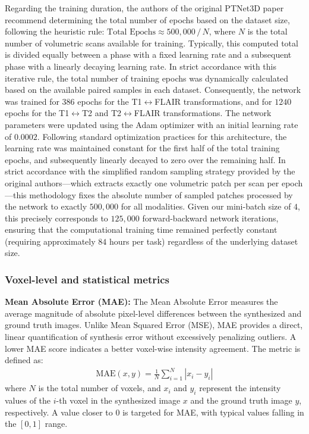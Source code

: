 \documentclass[11pt,a4paper]{article}
\begin{document}
Regarding the training duration, the authors of the original PTNet3D paper recommend determining the total number of epochs based on the dataset size, following the heuristic rule: \(\text{Total Epochs} \approx 500,000 \, / \, N\), where \(N\) is the total number of volumetric scans available for training. Typically, this computed total is divided equally between a phase with a fixed learning rate and a subsequent phase with a linearly decaying learning rate. In strict accordance with this iterative rule, the total number of training epochs was dynamically calculated based on the available paired samples in each dataset. Consequently, the network was trained for $386$ epochs for the T1$\leftrightarrow$FLAIR transformations, and for $1240$ epochs for the T1$\leftrightarrow$T2 and T2$\leftrightarrow$FLAIR transformations. The network parameters were updated using the Adam optimizer with an initial learning rate of $0.0002$. Following standard optimization practices for this architecture, the learning rate was maintained constant for the first half of the total training epochs, and subsequently linearly decayed to zero over the remaining half. In strict accordance with the simplified random sampling strategy provided by the original authors---which extracts exactly one volumetric patch per scan per epoch---this methodology fixes the absolute number of sampled patches processed by the network to exactly $500,000$ for all modalities. Given our mini-batch size of $4$, this precisely corresponds to $125,000$ forward-backward network iterations, ensuring that the computational training time remained perfectly constant (requiring approximately $84$ hours per task) regardless of the underlying dataset size.

\subsubsection*{Voxel-level and statistical metrics}
\noindent
\textbf{Mean Absolute Error (MAE):} The Mean Absolute Error \cite{willmott2005advantages} measures the average magnitude of absolute pixel-level differences between the synthesized and ground truth images. Unlike Mean Squared Error (MSE), MAE provides a direct, linear quantification of synthesis error without excessively penalizing outliers. A lower MAE score indicates a better voxel-wise intensity agreement. The metric is defined as:
\begin{align}
    \text{MAE}(x, y) = \frac{1}{N} \sum_{i=1}^{N} |x_i - y_i|
\end{align}
where $N$ is the total number of voxels, and $x_i$ and $y_i$ represent the intensity values of the $i$-th voxel in the synthesized image $x$ and the ground truth image $y$, respectively. A value closer to $0$ is targeted for MAE, with typical values falling in the $[0, 1]$ range.
\end{document}
